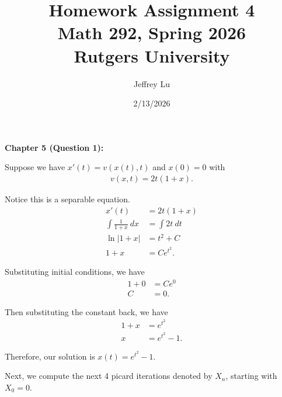 \documentclass[12pt]{article}
\title{Homework Assignment 4 \\ \large Math 292, Spring 2026 \\ Rutgers University}
\author{Jeffrey Lu}
\date{2/13/2026}
\begin{document}
\maketitle

\noindent \textbf{Chapter 5 (Question 1):}

Suppose we have $x'(t) = v(x(t), t)$ and $x(0) = 0$ with
\begin{align*}
    v(x,t) = 2t(1+x).
\end{align*}

Notice this is a separable equation.
\begin{align*}
    x'(t)                   & = 2t(1+x)      \\
    \int \frac{1}{1+x} ~ dx & = \int 2t ~ dt \\
    \ln|1+x|                & = t^2 + C      \\
    1+x                     & = Ce^{t^2}.
\end{align*}

Substituting initial conditions, we have
\begin{align*}
    1 + 0 & = Ce^0 \\
    C     & = 0.
\end{align*}

Then substituting the constant back, we have
\begin{align*}
    1 + x & = e^{t^2}     \\
    x     & = e^{t^2} -1.
\end{align*}

Therefore, our solution is $x(t) = e^{t^2} -1$.

\vspace{3ex}

Next, we compute the next 4 picard iterations denoted by $X_n$, starting with $X_0=0$.
\end{document}
